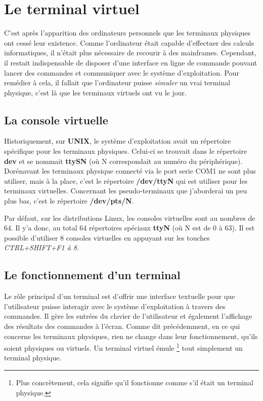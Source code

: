 \chapter{Le terminal virtuel}
C’est après l’apparition des ordinateurs personnels que les terminaux physiques ont cessé leur existence. Comme l’ordinateur était capable d’effectuer des calculs informatiques, il n'était plus nécessaire de recourir à des mainframes. Cependant, il restait indispensable de disposer d'une interface en ligne de commande pouvant lancer des commandes et communiquer avec le système d'exploitation. Pour remédier à cela, il fallait que l’ordinateur puisse \textit{simuler} un vrai terminal physique, c’est là que les terminaux virtuels ont vu le jour.

\section{La console virtuelle}
Historiquement, sur \textbf{UNIX}, le système d'exploitation avait un répertoire spécifique pour les terminaux physiques. Celui-ci se trouvait dans le répertoire \textbf{dev} et se nommait \textbf{ttySN} (où N correspondait au numéro du périphérique). Dorénavant les terminaux physique connecté via le port serie COM1 ne sont plus utiliser, mais à la place, c'est le répertoire \textbf{/dev/ttyN} qui est utiliser pour les terminaux virtuelles. Concernant les pseudo-terminaux que j'aborderai un peu plus bas, c'est le répertoire \textbf{/dev/pts/N}.
\newline

\begin{tcolorbox}[title=Pour information]
Par défaut, sur les distributions Linux, les consoles virtuelles sont au nombres de 64. Il y'a donc, au total 64 répertoires spéciaux \textbf{ttyN} (où N est de 0 à 63). Il est possible d'utiliser 8 consoles virtuelles en appuyant sur les touches \textit{CTRL+SHIFT+F1 à 8}.
\end{tcolorbox}

\newpage

\section{Le fonctionnement d'un terminal}
Le rôle principal d'un terminal est d'offrir une interface textuelle pour que l'utilisateur puisse interagir avec le système d'exploitation à travers des commandes. Il gère les entrées du clavier de l'utilisateur et également l'affichage des résultats des commandes à l'écran. Comme dit précédemment, en ce qui concerne les terminaux physiques, rien ne change dans leur fonctionnement, qu'ils soient physiques ou virtuels. Un terminal virtuel émule \footnote{Plus concrètement, cela signifie qu'il fonctionne comme s'il était un terminal physique.} tout simplement un terminal physique.

